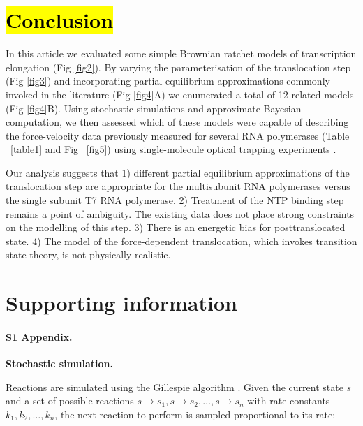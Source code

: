 \documentclass[10pt,letterpaper]{article}
\begin{document}
\section*{\hl{Conclusion}}


In this article we evaluated some simple Brownian ratchet models of transcription elongation (Fig \ref{fig2}). By varying the parameterisation of the translocation step  (Fig \ref{fig3}) and incorporating partial equilibrium approximations commonly invoked in the literature   (Fig \ref{fig4}A) we enumerated a total of 12 related models (Fig \ref{fig4}B). Using stochastic simulations and approximate Bayesian computation, we then assessed which of these models were capable of describing the force-velocity data previously measured for several RNA polymerases (Table ~\ref{table1} and Fig ~\ref{fig5}) using single-molecule optical trapping experiments \cite{abbondanzieri2005direct, schweikhard2014transcription, thomen2008t7}.

Our analysis suggests that 1) different partial equilibrium approximations of the translocation step are appropriate for the multisubunit RNA polymerases versus the single subunit  T7 RNA polymerase. 2) Treatment of the NTP binding step remains a point of ambiguity. The existing data does not place strong constraints on the modelling of this step. 3) There is an energetic bias for posttranslocated state. 4) The model of the force-dependent translocation, which invokes transition state theory, is not physically realistic.







\section*{Supporting information}



\paragraph*{S1 Appendix.}
\label{S1_Appendix}
\textbf{ Stochastic simulation.}


Reactions are simulated using the Gillespie algorithm \cite{gillespie1977exact}.  Given the current state $s$ and a set of possible reactions $s\rightarrow s_1, s\rightarrow s_2, \dotso, s\rightarrow s_n$ with rate constants $k_1, k_2, \dotso, k_n$, the next reaction to perform is sampled proportional to its rate:
\end{document}
